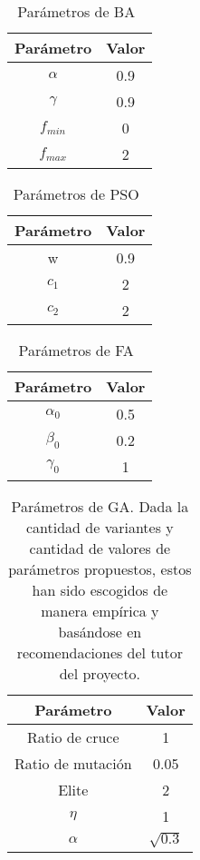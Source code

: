 \begin{table}[H]
    \centering
    \begin{tabular}{ c c }
        \hline
        \textbf{Parámetro} & \textbf{Valor} \\
        \hline
        $\alpha$           & 0.9            \\
        $\gamma $          & 0.9            \\
        $f_{min}$          & 0              \\
        $f_{max}$          & 2             \\
        \hline
    \end{tabular}
    \caption{Parámetros de BA~\cite{mirjalili_binary_2014}}
\end{table}

\begin{table}[H]
    \centering
    \begin{tabular}{ c c }
        \hline
        \textbf{Parámetro} & \textbf{Valor} \\
        \hline
        w                  & 0.9            \\
        $c_1$              & 2              \\
        $c_2$              & 2              \\
        \hline
    \end{tabular}
    \caption{Parámetros de PSO~\cite{mirjalili_s-shaped_2013}}
\end{table}

\begin{table}[H]
    \centering
    \begin{tabular}{ c c }
        \hline
        \textbf{Parámetro} & \textbf{Valor} \\
        \hline
        $\alpha_0$         & 0.5           \\
        $\beta_0$          & 0.2            \\
        $\gamma_0$         & 1              \\
        \hline
    \end{tabular}
    \caption{Parámetros de FA~\cite{zhang2016optimal}}
\end{table}

\begin{table}[H]
    \centering
    \begin{tabular}{ c c }
        \hline
        \textbf{Parámetro} & \textbf{Valor} \\
        \hline
        Ratio de cruce     & 1              \\
        Ratio de mutación  & 0.05           \\
        Elite              & 2              \\
        $\eta$             & 1              \\
        $\alpha$           & $\sqrt{0.3}$   \\
        \hline
    \end{tabular}
    \caption{Parámetros de GA. Dada la cantidad de variantes y cantidad de valores de parámetros propuestos, estos han sido escogidos de manera empírica y basándose en recomendaciones del tutor del proyecto.}
\end{table}

